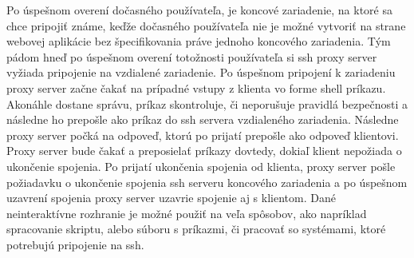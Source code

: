 Po úspešnom overení dočasného používateľa, je koncové zariadenie, na ktoré sa chce pripojiť známe, keďže dočasného používateľa
nie je možné vytvoriť na strane webovej aplikácie bez špecifikovania práve jednoho koncového zariadenia.
Tým pádom hneď po úspešnom overení totožnosti používateľa si ssh proxy server vyžiada pripojenie na vzdialené zariadenie.
Po úspešnom pripojení k zariadeniu proxy server začne čakať na prípadné vstupy z klienta vo forme shell príkazu.
Akonáhle dostane správu, príkaz skontroluje, či neporušuje pravidlá bezpečnosti a následne ho prepošle ako príkaz do ssh
servera vzdialeného zariadenia.
Následne proxy server počká na odpoveď, ktorú po prijatí prepošle ako odpoveď klientovi.
Proxy server bude čakať a preposielať príkazy dovtedy, dokiaľ klient nepožiada o ukončenie spojenia.
Po prijatí ukončenia spojenia od klienta, proxy server pošle požiadavku o ukončenie spojenia ssh serveru koncového zariadenia
a po úspešnom uzavrení spojenia proxy server uzavrie spojenie aj s klientom.
Dané neinteraktívne rozhranie je možné použiť na veľa spôsobov, ako napríklad spracovanie skriptu, alebo súboru s príkazmi,
či pracovať so systémami, ktoré potrebujú pripojenie na ssh.
